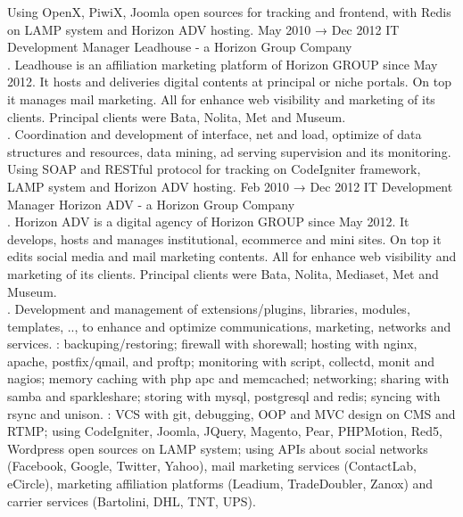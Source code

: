\documentclass[9pt]{stackoverflow-upgraded-version} %
\begin{document}
\begin{entrylist}
{		Using OpenX, PiwiX, Joomla open sources for tracking and frontend, with Redis on LAMP system and Horizon ADV hosting.}
	\entry
		{May 2010 → Dec 2012}
		{IT Development Manager}
		{Leadhouse - a Horizon Group Company}
		{\\
		. Leadhouse is an affiliation marketing platform of Horizon GROUP since May 2012. It hosts and
		deliveries digital contents at principal or niche portals. On top it manages mail marketing. All for enhance web visibility and
		marketing of its clients. Principal clients were Bata, Nolita, Met and Museum.\\
		. Coordination and development of interface, net and load, optimize of data structures and resources, data
		mining, ad serving supervision and its monitoring. Using SOAP and RESTful protocol for tracking on CodeIgniter framework,
		LAMP system and Horizon ADV hosting.}
	\entry
		{Feb 2010 → Dec 2012}
		{IT Development Manager}
		{Horizon ADV - a Horizon Group Company}
		{\\
		. Horizon ADV is a digital agency of Horizon GROUP since May 2012. It develops, hosts and manages
		institutional, ecommerce and mini sites. On top it edits social media and mail marketing contents. All for enhance web
		visibility and marketing of its clients. Principal clients were Bata, Nolita, Mediaset, Met and Museum.\\
		. Development and management of extensions/plugins, libraries, modules, templates, .., to enhance and optimize
		communications, marketing, networks and services. : backuping/restoring; firewall with shorewall; hosting with
		nginx, apache, postfix/qmail, and proftp; monitoring with script, collectd, monit and nagios; memory caching with php apc and
		memcached; networking; sharing with samba and sparkleshare; storing with mysql, postgresql and redis; syncing with rsync
		and unison. : VCS with git, debugging, OOP and MVC design on CMS and RTMP; using CodeIgniter, Joomla, JQuery,
		Magento, Pear, PHPMotion, Red5, Wordpress open sources on LAMP system; using APIs about social networks (Facebook, Google, Twitter, Yahoo),
		mail marketing services (ContactLab, eCircle), marketing affiliation platforms (Leadium, TradeDoubler, Zanox) and carrier services (Bartolini, DHL, TNT, UPS).
}
\end{entrylist}
\end{document}
